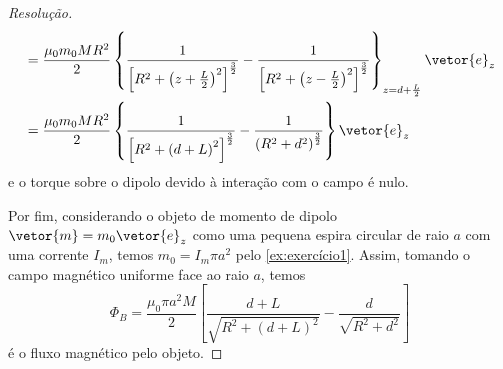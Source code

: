 \begin{proof}[Resolução]
\begin{align*}
                  &= \frac{\mu_0 m_0M R^2}{2}\left\{\frac{1}{\left[R^2 + \left(z + \frac{L}{2}\right)^2\right]^{\frac32}} - \frac{1}{\left[R^2 + \left(z - \frac{L}{2}\right)^2\right]^{\frac32}}\right\}_{z = d +\frac{L}{2}}\vetor{e}_z\\
                  &= \frac{\mu_0 m_0M R^2}{2}\left\{\frac{1}{\left[R^2 + \left(d + L\right)^2\right]^{\frac32}} - \frac{1}{\left(R^2 + d^2\right)^{\frac32}}\right\}\vetor{e}_z
    \end{align*}
    e o torque sobre o dipolo devido à interação com o campo é nulo.

    Por fim, considerando o objeto de momento de dipolo \(\vetor{m} = m_0 \vetor{e}_z\) como uma pequena espira circular de raio \(a\) com uma corrente \(I_m\), temos \(m_0 = I_m \pi a^2\) pelo \cref{ex:exercício1}. Assim, tomando o campo magnético uniforme face ao raio \(a\), temos
    \begin{equation*}
        \Phi_B = \frac{\mu_0 \pi a^2 M}{2}\left[\frac{d + L}{\sqrt{R^2 + \left(d + L\right)^2}} - \frac{d}{\sqrt{R^2 + d^2}}\right]
    \end{equation*}
    é o fluxo magnético pelo objeto.
\end{proof}
